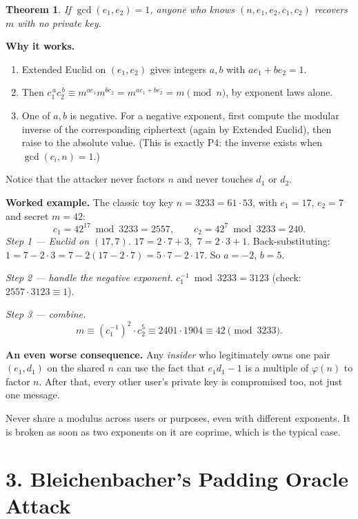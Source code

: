 \documentclass[11pt]{article}
\newtheorem{theorem}{Theorem}
\begin{document}
\begin{theorem}
If $\gcd(e_1,e_2)=1$, anyone who knows $(n,e_1,e_2,c_1,c_2)$ recovers $m$ with no private key.
\end{theorem}

\textbf{Why it works.}
\begin{enumerate}[nosep]
\item Extended Euclid on $(e_1,e_2)$ gives integers $a,b$ with $ae_1+be_2=1$.
\item Then $c_1^{\,a}c_2^{\,b}\equiv m^{ae_1}m^{be_2}=m^{ae_1+be_2}=m \pmod n$, by exponent laws alone.
\item One of $a,b$ is negative. For a negative exponent, first compute the modular inverse of the corresponding ciphertext (again by Extended Euclid), then raise to the absolute value. (This is exactly P4: the inverse exists when $\gcd(c_i,n)=1$.)
\end{enumerate}
Notice that the attacker never factors $n$ and never touches $d_1$ or $d_2$.

\textbf{Worked example.} The classic toy key $n=3233=61\cdot53$, with $e_1=17$, $e_2=7$ and secret $m=42$:
\[
c_1=42^{17}\bmod3233=2557,\qquad c_2=42^{7}\bmod3233=240.
\]
\emph{Step 1 --- Euclid on $(17,7)$.}
$17=2\cdot7+3$, $\ 7=2\cdot3+1$. Back-substituting: $1=7-2\cdot3=7-2(17-2\cdot7)=5\cdot7-2\cdot17$. So $a=-2$, $b=5$.

\emph{Step 2 --- handle the negative exponent.} $c_1^{-1}\bmod3233=3123$ (check: $2557\cdot3123\equiv1$).

\emph{Step 3 --- combine.}
\[
m\equiv (c_1^{-1})^{2}\cdot c_2^{5} \equiv 2401\cdot1904 \equiv 42 \pmod{3233}.
\]

\textbf{An even worse consequence.} Any \emph{insider} who legitimately owns one pair $(e_1,d_1)$ on the shared $n$ can use the fact that $e_1d_1-1$ is a multiple of $\varphi(n)$ to factor $n$. After that, every other user's private key is compromised too, not just one message.

\begin{fixbox}
Never share a modulus across users or purposes, even with different exponents. It is broken as soon as two exponents on it are coprime, which is the typical case.
\end{fixbox}

\hrulefill

\section*{3. Bleichenbacher's Padding Oracle Attack}
\end{document}
